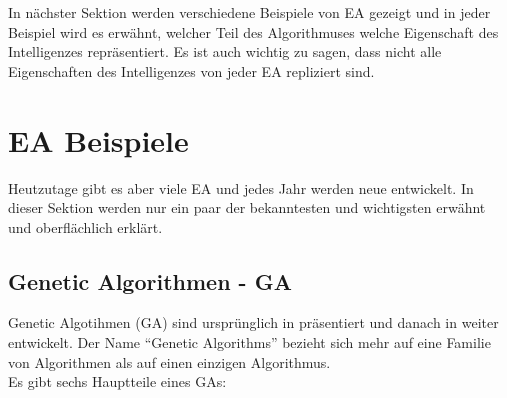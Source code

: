 \documentclass[twoside,twocolumn]{article}
\begin{document}
In nächster Sektion werden verschiedene Beispiele von EA gezeigt und in jeder Beispiel wird es erwähnt, welcher Teil des Algorithmuses welche Eigenschaft des Intelligenzes repräsentiert. Es ist auch wichtig zu sagen, dass nicht alle Eigenschaften des Intelligenzes von jeder EA repliziert sind.


\section{EA Beispiele}

Heutzutage gibt es aber viele EA und jedes Jahr werden neue entwickelt. In dieser Sektion werden nur ein paar der bekanntesten und wichtigsten erwähnt und oberflächlich erklärt.

\subsection{Genetic Algorithmen - GA}
Genetic Algotihmen (GA) sind ursprünglich in \cite{holland_ga} präsentiert und danach in \cite{goldberg_ga} weiter entwickelt. Der Name ``Genetic Algorithms'' bezieht sich mehr auf eine Familie von Algorithmen als auf einen einzigen Algorithmus.\\
Es gibt sechs Hauptteile eines GAs:
\end{document}
